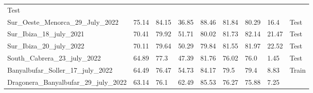 \begin{table}[H]
{\begin{tabular}{lllllllll}
            {\color[HTML]{fc8d62} Test}
            \\
            Sur\_Oeste\_Menorca\_29\_July\_2022    & 75.14               &
            84.15
                                                   & 36.85               &
            88.46
                                                   & 81.84               &
            80.29
                                                   & 16.4                &
            {\color[HTML]{fc8d62} Test}
            \\
            Sur\_Ibiza\_18\_july\_2021             & 70.41               &
            79.92
                                                   & 51.71               &
            80.02
                                                   & 81.73               &
            82.14
                                                   & 21.47               &
            {\color[HTML]{fc8d62} Test}
            \\
            Sur\_Ibiza\_20\_july\_2022             & 70.11               &
            79.64
                                                   & 50.29               &
            79.84
                                                   & 81.55               &
            81.97
                                                   & 22.52               &
            {\color[HTML]{fc8d62} Test}
            \\
            South\_Cabrera\_23\_july\_2022         & 64.89               & 77.3
                                                   & 47.39               &
            81.76
                                                   & 76.02               & 76.0
                                                   & 1.45                &
            {\color[HTML]{fc8d62} Test}
            \\
            Banyalbufar\_Soller\_17\_july\_2022    & 64.49               &
            76.47
                                                   & 54.73               &
            84.17
                                                   & 79.5                & 79.4
                                                   & 8.83                &
            {\color[HTML]{66c2a5} Train}
            \\
            Dragonera\_Banyalbufar\_29\_july\_2022 & 63.14               & 76.1
                                                   & 62.49               &
            85.53
                                                   & 76.27               &
            75.88
                                                   & 7.25                &

\end{tabular}}
\end{table}
